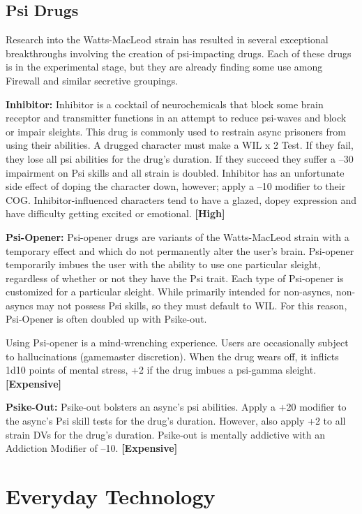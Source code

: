 \subsection{Psi Drugs}

Research into the Watts-MacLeod strain has resulted in 
several exceptional breakthroughs involving the creation 
of psi-impacting drugs. Each of these drugs is in the experimental
stage, but they are already finding some use
among Firewall and similar secretive groupings.

\textbf{Inhibitor:} Inhibitor is a cocktail of neurochemicals 
that block some brain receptor and transmitter functions
in an attempt to reduce psi-waves and block or
impair sleights. This drug is commonly used to restrain 
async prisoners from using their abilities. A drugged 
character must make a WIL x 2 Test. If they fail, they 
lose all psi abilities for the drug's duration. If they succeed
they suffer a –30 impairment on Psi skills and
all strain is doubled. Inhibitor has an unfortunate side 
effect of doping the character down, however; apply 
a –10 modifier to their COG. Inhibitor-influenced 
characters tend to have a glazed, dopey expression and 
have difficulty getting excited or emotional. \textbf{[High]}

\textbf{Psi-Opener:} Psi-opener drugs are variants of the 
Watts-MacLeod strain with a temporary effect and 
which do not permanently alter the user's brain. Psi-opener
temporarily imbues the user with the ability
to use one particular sleight, regardless of whether or 
not they have the Psi trait. Each type of Psi-opener is 
customized for a particular sleight. While primarily 
intended for non-asyncs, non-asyncs may not possess 
Psi skills, so they must default to WIL. For this reason, 
Psi-Opener is often doubled up with Psike-out.

Using Psi-opener is a mind-wrenching experience. 
Users are occasionally subject to hallucinations 
(gamemaster discretion). When the drug wears off, it 
inflicts 1d10 points of mental stress, +2 if the drug 
imbues a psi-gamma sleight. \textbf{[Expensive]}

\textbf{Psike-Out:} Psike-out bolsters an async's psi abilities. 
Apply a +20 modifier to the async's Psi skill tests for the 
drug's duration. However, also apply +2 to all strain 
DVs for the drug's duration. Psike-out is mentally addictive
with an Addiction Modifier of –10. \textbf{[Expensive]}

\section{Everyday Technology}

